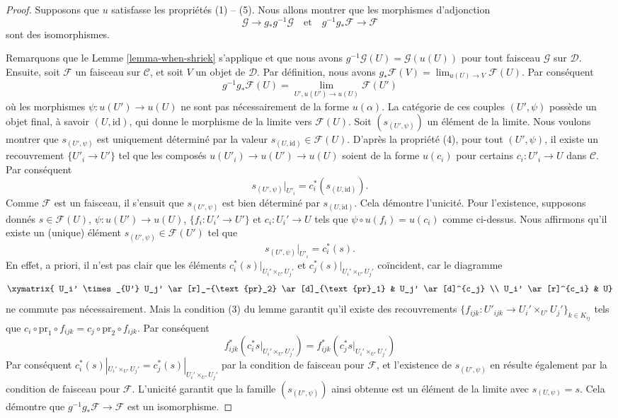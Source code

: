 \begin{proof}
Supposons que $u$ satisfasse les propriétés (1) -- (5). Nous allons montrer que
les morphismes d’adjonction
$$
\mathcal{G} \longrightarrow g_*g^{-1}\mathcal{G}
\quad\text{et}\quad
g^{-1}g_*\mathcal{F} \longrightarrow \mathcal{F}
$$
sont des isomorphismes.

\medskip\noindent
Remarquons que le Lemme \ref{lemma-when-shriek} s’applique et que nous avons
$g^{-1}\mathcal{G}(U) = \mathcal{G}(u(U))$ pour tout faisceau $\mathcal{G}$
sur $\mathcal{D}$. Ensuite, soit $\mathcal{F}$ un faisceau sur $\mathcal{C}$,
et soit $V$ un objet de $\mathcal{D}$. Par définition, nous avons
$g_*\mathcal{F}(V) = \lim_{u(U) \to V} \mathcal{F}(U)$.
Par conséquent
$$
g^{-1}g_*\mathcal{F}(U) = \lim_{U', u(U') \to u(U)} \mathcal{F}(U')
$$
où les morphismes $\psi : u(U') \to u(U)$ ne sont pas nécessairement de la forme
$u(\alpha)$. La catégorie de ces couples $(U', \psi)$ possède un objet final,
à savoir $(U, \text{id})$, qui donne le morphisme de
la limite vers $\mathcal{F}(U)$. Soit $(s_{(U', \psi)})$ un élément
de la limite. Nous voulons montrer que $s_{(U', \psi)}$ est uniquement déterminé
par la valeur $s_{(U, \text{id})} \in \mathcal{F}(U)$. D’après la propriété (4), pour
tout $(U', \psi)$, il existe un recouvrement $\{U'_i \to U'\}$ tel que les
composés $u(U'_i) \to u(U') \to u(U)$ soient de la forme $u(c_i)$
pour certains $c_i : U'_i \to U$ dans $\mathcal{C}$. Par conséquent
$$
s_{(U', \psi)}|_{U'_i} = c_i^*(s_{(U, \text{id})}).
$$
Comme $\mathcal{F}$ est un faisceau, il s’ensuit que $s_{(U', \psi)}$
est bien déterminé par $s_{(U, \text{id})}$. Cela démontre l’unicité.
Pour l’existence, supposons donnés
$s \in \mathcal{F}(U)$, $\psi : u(U') \to u(U)$, $\{f_i : U_i' \to U'\}$
et $c_i : U_i' \to U$ tels que $\psi \circ u(f_i) = u(c_i)$ comme ci-dessus.
Nous affirmons qu’il existe un (unique) élément
$s_{(U', \psi)} \in \mathcal{F}(U')$ tel que
$$
s_{(U', \psi)}|_{U'_i} = c_i^*(s).
$$
En effet, a priori, il n’est pas clair que les éléments
$c_i^*(s)|_{U_i' \times_{U'} U_j'}$
et $c_j^*(s)|_{U_i' \times_{U'} U_j'}$ coïncident, car
le diagramme
$$
\xymatrix{
U_i' \times_{U'} U_j' \ar[r]_-{\text{pr}_2} \ar[d]_{\text{pr}_1} &
U_j' \ar[d]^{c_j} \\
U_i' \ar[r]^{c_i} & U}
$$
ne commute pas nécessairement. Mais la condition (3) du lemme garantit qu’il
existe des recouvrements
$\{f_{ijk} : U'_{ijk} \to U_i' \times_{U'} U_j'\}_{k \in K_{ij}}$ tels que
$c_i \circ \text{pr}_1 \circ f_{ijk} = c_j \circ \text{pr}_2 \circ f_{ijk}$.
Par conséquent
$$
f_{ijk}^* \left(c_i^*s|_{U_i' \times_{U'} U_j'}\right)
=
f_{ijk}^* \left(c_j^*s|_{U_i' \times_{U'} U_j'}\right)
$$
Par conséquent $c_i^*(s)|_{U_i' \times_{U'} U_j'} = c_j^*(s)|_{U_i' \times_{U'} U_j'}$
par la condition de faisceau pour $\mathcal{F}$, et l’existence de
$s_{(U', \psi)}$ en résulte également par la condition de faisceau pour $\mathcal{F}$. L’unicité
garantit que la famille $(s_{(U', \psi)})$ ainsi obtenue est un élément
de la limite avec $s_{(U, \psi)} = s$. Cela démontre
que $g^{-1}g_*\mathcal{F} \to \mathcal{F}$ est un isomorphisme.


\end{proof}
